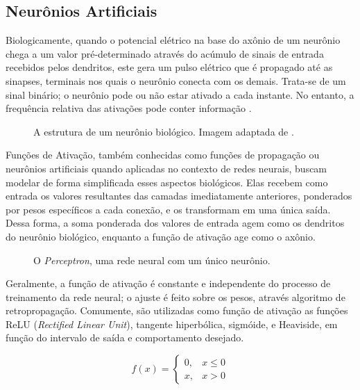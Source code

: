 \subsection{Neurônios Artificiais}

Biologicamente, quando o potencial elétrico na base do axônio de um neurônio chega a um valor pré-determinado através do acúmulo de sinais de entrada recebidos pelos dendritos, este gera um pulso elétrico que é propagado até as sinapses, terminais nos quais o neurônio conecta com os demais.
Trata-se de um sinal binário; o neurônio pode ou não estar ativado a cada instante. No entanto, a frequência relativa das ativações pode conter informação \cite{behnkeHierarchicalNeuralNetworks2003}.

\begin{figure}[H]
    \centering
    
    \caption{A estrutura de um neurônio biológico. Imagem adaptada de \cite{dhp1080IdoSkemoPri2016}.}
    \label{fig:bio_neuron}
\end{figure}

Funções de Ativação, também conhecidas como funções de propagação ou neurônios artificiais quando aplicadas no contexto de redes neurais, buscam modelar de forma simplificada esses aspectos biológicos.
Elas recebem como entrada os valores resultantes das camadas imediatamente anteriores, ponderados por pesos específicos a cada conexão, e os transformam em uma única saída.
Dessa forma, a soma ponderada dos valores de entrada agem como os dendritos do neurônio biológico, enquanto a função de ativação age como o axônio.

\begin{figure}[H]
    \centering
    
    \caption{O \textit{Perceptron}, uma rede neural com um único neurônio.}
    \label{fig:perceptron}
\end{figure}

Geralmente, a função de ativação é constante e independente do processo de treinamento da rede neural; o ajuste é feito sobre os pesos, através algoritmo de retropropagação.
Comumente, são utilizadas como função de ativação as funções ReLU (\textit{Rectified Linear Unit}), tangente hiperbólica, sigmóide, e Heaviside, em função do intervalo de saída e comportamento desejado.

\begin{equation}\label{eq:relu}
    f(x) = \left\{
        \begin{array}{ll}
            0, & x \le 0\\
            x, & x > 0
        \end{array}
    \right.
\end{equation}

